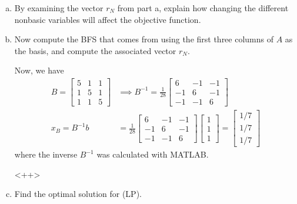 \documentclass{article}
\begin{document}
\begin{enumerate}
\begin{enumerate}[a)]
\begin{soln}
				\end{soln}<++>

			\item By examining the vector $r_N$ from part a, explain how changing the different nonbasic variables will affect the objective function.

			\item Now compute the BFS that comes from using the first three columns of $A$ as the basis, and compute the associated vector $r_N.$
				\begin{soln}
					Now, we have 
					\begin{align*}
						B=\begin{bmatrix}
							5 & 1 & 1 \\
							1 & 5 & 1 \\
							1 & 1 & 5
						\end{bmatrix}&\implies B^{-1} = \frac{1}{28}\begin{bmatrix}
							6 & -1 & -1 \\
							-1 & 6 & -1 \\
							-1 & -1 & 6
						\end{bmatrix} \\
						x_B =B^{-1}b &= \frac{1}{28}\begin{bmatrix}
							6 & -1 & -1 \\
							-1 & 6 & -1 \\
							-1 & -1 & 6
						\end{bmatrix} \begin{bmatrix}
							1 \\ 1 \\ 1
						\end{bmatrix} = \begin{bmatrix}
							1/7 \\ 1/7 \\ 1/7
						\end{bmatrix}
					\end{align*} where the inverse $B^{-1}$ was calculated with MATLAB.

				\end{soln}<++>

			\item Find the optimal solution for (LP).
				
		\end{enumerate}


\end{enumerate}
\end{document}
